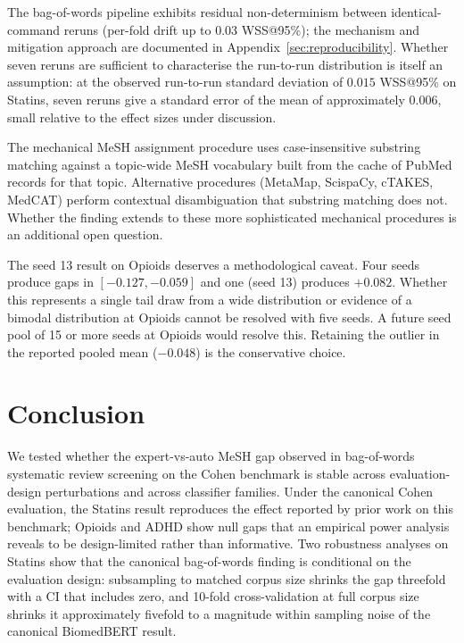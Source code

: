 \documentclass{article}
\begin{document}
The bag-of-words pipeline exhibits residual non-determinism between identical-command reruns (per-fold drift up to 0.03 WSS@95\%); the mechanism and mitigation approach are documented in Appendix~\ref{sec:reproducibility}. Whether seven reruns are sufficient to characterise the run-to-run distribution is itself an assumption: at the observed run-to-run standard deviation of $0.015$ WSS@95\% on Statins, seven reruns give a standard error of the mean of approximately $0.006$, small relative to the effect sizes under discussion.

The mechanical MeSH assignment procedure uses case-insensitive substring matching against a topic-wide MeSH vocabulary built from the cache of PubMed records for that topic. Alternative procedures (MetaMap, ScispaCy, cTAKES, MedCAT) perform contextual disambiguation that substring matching does not. Whether the finding extends to these more sophisticated mechanical procedures is an additional open question.

The seed 13 result on Opioids deserves a methodological caveat. Four seeds produce gaps in $[-0.127, -0.059]$ and one (seed 13) produces $+0.082$. Whether this represents a single tail draw from a wide distribution or evidence of a bimodal distribution at Opioids cannot be resolved with five seeds. A future seed pool of 15 or more seeds at Opioids would resolve this. Retaining the outlier in the reported pooled mean ($-0.048$) is the conservative choice.

\section{Conclusion}

We tested whether the expert-vs-auto MeSH gap observed in bag-of-words systematic review screening on the Cohen benchmark is stable across evaluation-design perturbations and across classifier families. Under the canonical Cohen evaluation, the Statins result reproduces the effect reported by prior work on this benchmark; Opioids and ADHD show null gaps that an empirical power analysis reveals to be design-limited rather than informative. Two robustness analyses on Statins show that the canonical bag-of-words finding is conditional on the evaluation design: subsampling to matched corpus size shrinks the gap threefold with a CI that includes zero, and 10-fold cross-validation at full corpus size shrinks it approximately fivefold to a magnitude within sampling noise of the canonical BiomedBERT result.
\end{document}
